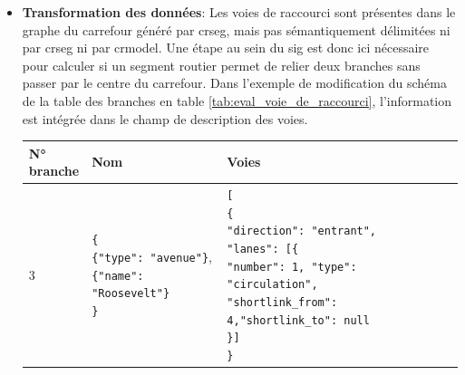 \begin{itemize}
    \item \textbf{Transformation des données}: Les voies de raccourci sont présentes dans le graphe du carrefour généré par crseg, mais pas sémantiquement délimitées ni par crseg ni par crmodel. Une étape au sein du \gls{sig} est donc ici nécessaire pour calculer si un segment routier permet de relier deux branches sans passer par le centre du carrefour. Dans l'exemple de modification du schéma de la table des branches en table \ref{tab:eval_voie_de_raccourci}, l'information est intégrée dans le champ de description des voies.
    \begin{table}[ht]
        \begin{center}
            \footnotesize
            \begin{tabular}{ | l | l | l | }
                \makecell{\textbf{N°}\\\textbf{branche}} & \textbf{Nom} & \textbf{Voies}\\
                \hline
                3 &
                \makecell{
                    \texttt{\{}\\
                    \hspace{0.5cm}\texttt{\{"type": "avenue"\}},\\
                    \hspace{0.5cm}\texttt{\{"name": "Roosevelt"\}}\\
                    \texttt\}
                } &
                \makecell{
                    \texttt[\\
                    \hspace{0.5cm}\texttt{\{}\\
                    \hspace{1cm}\texttt{"direction": "entrant",}\\
                    \hspace{1cm}\texttt{"lanes": [\{}\\
                    \hspace{1.5cm}\texttt{"number": 1, "type": "circulation",}\\
                    \hspace{1.5cm}\texttt{"shortlink\_from": 4,}\texttt{"shortlink\_to": null}\\
                    \hspace{1cm}\texttt{\}]}\\
                    \hspace{0.5cm}\texttt\}\\
}
\end{tabular}
\end{center}
\end{table}
\end{itemize}
